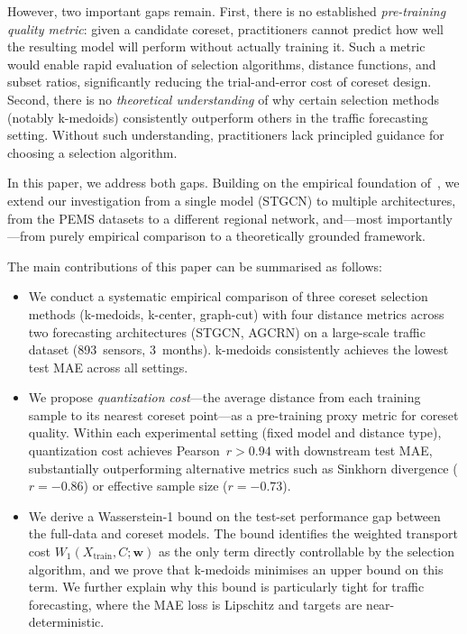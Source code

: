 \documentclass[journal]{IEEEtran}
\newcommand{\Wone}{W_1}
\newcommand{\Xtrain}{X_{\mathrm{train}}}
\begin{document}
However, two important gaps remain.
First, there is no established \emph{pre-training quality metric}:
given a candidate coreset, practitioners cannot predict how well the
resulting model will perform without actually training it.
Such a metric would enable rapid evaluation of selection algorithms,
distance functions, and subset ratios, significantly reducing the
trial-and-error cost of coreset design.
Second, there is no \emph{theoretical understanding} of why certain
selection methods (notably k-medoids) consistently outperform others
in the traffic forecasting setting.
Without such understanding, practitioners lack principled guidance
for choosing a selection algorithm.

In this paper, we address both gaps.
Building on the empirical foundation of~\cite{our_itsc}, we extend
our investigation from a single model (STGCN) to multiple
architectures, from the PEMS datasets to a different regional
network, and---most importantly---from purely empirical comparison
to a theoretically grounded framework.

The main contributions of this paper can be summarised as follows:
\begin{itemize}
  \item We conduct a systematic empirical comparison of three coreset
    selection methods (k-medoids, k-center, graph-cut) with four
    distance metrics across two forecasting architectures (STGCN,
    AGCRN) on a large-scale traffic dataset (893~sensors, 3~months).
    k-medoids consistently achieves the lowest test MAE across all
    settings.

  \item We propose \emph{quantization cost}---the average distance
    from each training sample to its nearest coreset point---as a
    pre-training proxy metric for coreset quality.
    Within each experimental setting (fixed model and distance type),
    quantization cost achieves Pearson~$r > 0.94$ with downstream
    test MAE, substantially outperforming alternative metrics such as
    Sinkhorn divergence ($r = -0.86$) or effective sample
    size ($r = -0.73$).

  \item We derive a Wasserstein-1 bound on the test-set performance
    gap between the full-data and coreset models.
    The bound identifies the weighted transport cost
    $\Wone(\Xtrain, C; \mathbf{w})$ as the only term directly
    controllable by the selection algorithm, and we prove that
    k-medoids minimises an upper bound on this term.
    We further explain why this bound is particularly tight for
    traffic forecasting, where the MAE loss is Lipschitz and
    targets are near-deterministic.
\end{itemize}
\end{document}
